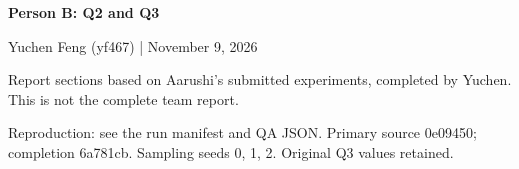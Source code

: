 \documentclass[11pt,letterpaper]{article}
\begin{document}
{\Large\bfseries\color{navy} Person B: Q2 and Q3}\par
Yuchen Feng (yf467) | November 9, 2026\par
{\small Report sections based on Aarushi's submitted experiments, completed by Yuchen. This is not the complete team report.}
\setcounter{section}{3}

\par\vspace{0.4em}
{\small\color{muted}Reproduction: see the run manifest and QA JSON. Primary source 0e09450; completion 6a781cb. Sampling seeds 0, 1, 2. Original Q3 values retained.}\par
\end{document}
